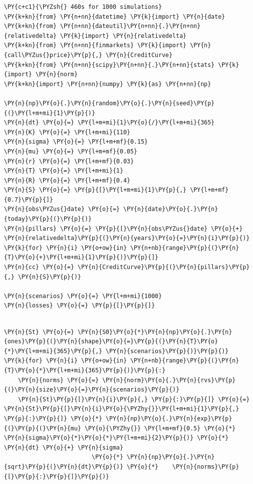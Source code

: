 \begin{Answer}
\begin{codebox}[size=fbox, boxrule=1pt, colback=cellbackground, colframe=cellborder]
\begin{Verbatim}[commandchars=\\\{\}]
\PY{c+c1}{\PYZsh{} 460s for 1000 simulations}
\PY{k+kn}{from} \PY{n+nn}{datetime} \PY{k}{import} \PY{n}{date}
\PY{k+kn}{from} \PY{n+nn}{dateutil}\PY{n+nn}{.}\PY{n+nn}{relativedelta} \PY{k}{import} \PY{n}{relativedelta}
\PY{k+kn}{from} \PY{n+nn}{finmarkets} \PY{k}{import} \PY{n}{call\PYZus{}price}\PY{p}{,} \PY{n}{CreditCurve}
\PY{k+kn}{from} \PY{n+nn}{scipy}\PY{n+nn}{.}\PY{n+nn}{stats} \PY{k}{import} \PY{n}{norm}
\PY{k+kn}{import} \PY{n+nn}{numpy} \PY{k}{as} \PY{n+nn}{np}
		
\PY{n}{np}\PY{o}{.}\PY{n}{random}\PY{o}{.}\PY{n}{seed}\PY{p}{(}\PY{l+m+mi}{1}\PY{p}{)}
\PY{n}{dt} \PY{o}{=} \PY{l+m+mi}{1}\PY{o}{/}\PY{l+m+mi}{365}
\PY{n}{K} \PY{o}{=} \PY{l+m+mi}{110}
\PY{n}{sigma} \PY{o}{=} \PY{l+m+mf}{0.15}
\PY{n}{mu} \PY{o}{=} \PY{l+m+mf}{0.05}
\PY{n}{r} \PY{o}{=} \PY{l+m+mf}{0.03}
\PY{n}{T} \PY{o}{=} \PY{l+m+mi}{1}
\PY{n}{R} \PY{o}{=} \PY{l+m+mf}{0.4}
\PY{n}{S} \PY{o}{=} \PY{p}{[}\PY{l+m+mi}{1}\PY{p}{,} \PY{l+m+mf}{0.7}\PY{p}{]}
\PY{n}{obs\PYZus{}date} \PY{o}{=} \PY{n}{date}\PY{o}{.}\PY{n}{today}\PY{p}{(}\PY{p}{)}
\PY{n}{pillars} \PY{o}{=} \PY{p}{[}\PY{n}{obs\PYZus{}date} \PY{o}{+} \PY{n}{relativedelta}\PY{p}{(}\PY{n}{years}\PY{o}{=}\PY{n}{i}\PY{p}{)} \PY{k}{for} \PY{n}{i} \PY{o+ow}{in} \PY{n+nb}{range}\PY{p}{(}\PY{n}{T}\PY{o}{+}\PY{l+m+mi}{1}\PY{p}{)}\PY{p}{]}
\PY{n}{cc} \PY{o}{=} \PY{n}{CreditCurve}\PY{p}{(}\PY{n}{pillars}\PY{p}{,} \PY{n}{S}\PY{p}{)}
		
\PY{n}{scenarios} \PY{o}{=} \PY{l+m+mi}{1000}
\PY{n}{losses} \PY{o}{=} \PY{p}{[}\PY{p}{]}
\end{Verbatim}
\end{codebox}		

\begin{codebox}[size=fbox, boxrule=1pt, colback=cellbackground, colframe=cellborder]
\begin{Verbatim}[commandchars=\\\{\}]

\PY{n}{St} \PY{o}{=} \PY{n}{S0}\PY{o}{*}\PY{n}{np}\PY{o}{.}\PY{n}{ones}\PY{p}{(}\PY{n}{shape}\PY{o}{=}\PY{p}{(}\PY{n}{T}\PY{o}{*}\PY{l+m+mi}{365}\PY{p}{,} \PY{n}{scenarios}\PY{p}{)}\PY{p}{)}    
\PY{k}{for} \PY{n}{i} \PY{o+ow}{in} \PY{n+nb}{range}\PY{p}{(}\PY{n}{T}\PY{o}{*}\PY{l+m+mi}{365}\PY{p}{)}\PY{p}{:}
    \PY{n}{norms} \PY{o}{=} \PY{n}{norm}\PY{o}{.}\PY{n}{rvs}\PY{p}{(}\PY{n}{size}\PY{o}{=}\PY{n}{scenarios}\PY{p}{)}
    \PY{n}{St}\PY{p}{[}\PY{n}{i}\PY{p}{,} \PY{p}{:}\PY{p}{]} \PY{o}{=} \PY{n}{St}\PY{p}{[}\PY{n}{i}\PY{o}{\PYZhy{}}\PY{l+m+mi}{1}\PY{p}{,} \PY{p}{:}\PY{p}{]} \PY{o}{*} \PY{n}{np}\PY{o}{.}\PY{n}{exp}\PY{p}{(}\PY{p}{(}\PY{n}{mu} \PY{o}{\PYZhy{}} \PY{l+m+mf}{0.5} \PY{o}{*} \PY{n}{sigma}\PY{o}{*}\PY{o}{*}\PY{l+m+mi}{2}\PY{p}{)} \PY{o}{*} \PY{n}{dt} \PY{o}{+} \PY{n}{sigma}
                         \PY{o}{*} \PY{n}{np}\PY{o}{.}\PY{n}{sqrt}\PY{p}{(}\PY{n}{dt}\PY{p}{)} \PY{o}{*} 	\PY{n}{norms}\PY{p}{[}\PY{p}{:}\PY{p}{]}\PY{p}{)}
		

\end{Verbatim}
\end{codebox}
\end{Answer}
